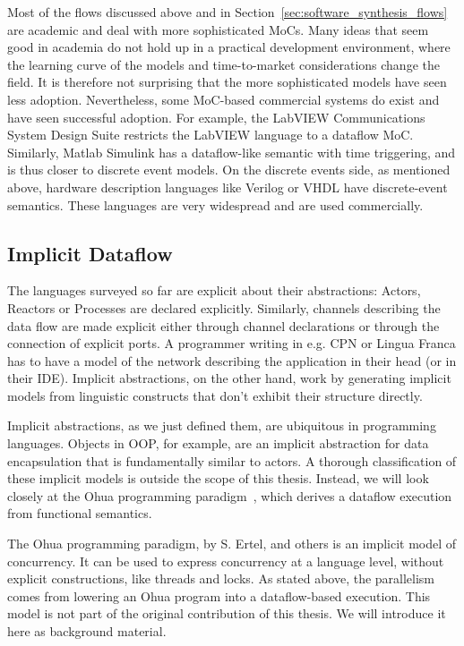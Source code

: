 Most of the flows discussed above and in Section~\ref{sec:software_synthesis_flows} are academic and deal with more sophisticated \acp{MoC}. 
Many ideas that seem good in academia do not hold up in a practical development environment, where the learning curve of the models and time-to-market considerations change the field.
It is therefore not surprising that the more sophisticated models have seen less adoption.
Nevertheless, some \ac{MoC}-based commercial systems do exist and have seen successful adoption.
For example, the LabVIEW Communications System Design Suite restricts the LabVIEW language to a dataflow \ac{MoC}.
Similarly, Matlab Simulink has a dataflow-like semantic with time triggering, and is thus closer to discrete event models.
On the discrete events side, as mentioned above, hardware description languages like Verilog or VHDL have discrete-event semantics.
These languages are very widespread and are used commercially.

\subsection{Implicit Dataflow}

The languages surveyed so far are explicit about their abstractions: Actors, Reactors or Processes are declared explicitly.
Similarly, channels describing the data flow are made explicit either through channel declarations or through the connection of explicit ports.
A programmer writing in e.g. \ac{CPN} or Lingua Franca has to have a model of the network describing the application in their head (or in their \acs{IDE}).
Implicit abstractions, on the other hand, work by generating implicit models from linguistic constructs that don't exhibit their structure directly.

Implicit abstractions, as we just defined them, are ubiquitous in programming languages.
Objects in \ac{OOP}, for example, are an implicit abstraction for data encapsulation that is fundamentally similar to actors.
A thorough classification  of these implicit models is outside the scope of this thesis.
Instead, we will look closely at the Ohua programming paradigm~\cite{ertel_phdthesis}, which derives a dataflow execution from functional semantics.

The Ohua programming paradigm, by S. Ertel, and others is an implicit model of concurrency. 
It can  be used to express concurrency at a language level, without explicit constructions, like threads and locks. 
As stated above, the parallelism comes from lowering an Ohua program into a dataflow-based execution.
This model is not part of the original contribution of this thesis.
We will introduce it here as background material.

